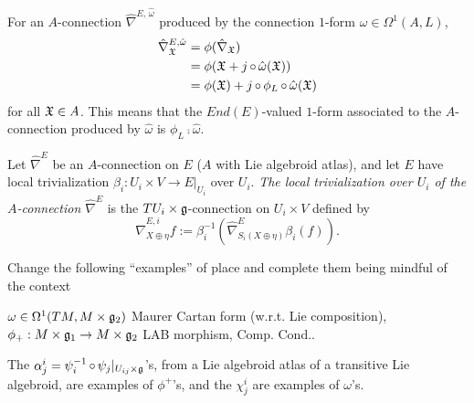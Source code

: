 For an $A$-connection $\hat \nabla^{E, \, \hat \omega}$ produced by the connection $1$-form $\hat \omega \in \Omega^1(A, L)$, 
\begin{align*}
    \hat \nabla^{E, \hat \omega}_{\oid X} &= \phi(\hat \nabla_{\oid X})\\
        &= \phi(\oid X + j \comp \hat \omega(\oid X)) \\
        &= \phi(\oid X) + j \comp \phi_L \comp \hat \omega (\oid X)
\end{align*}
for all $\mathfrak{X} \in A$. This means that the $End(E)$-valued $1$-form associated to the $A$-connection produced by $\hat \omega$ is $\phi_L \comp \hat \omega$.

\begin{definition}\label{definitionLocalTrivializationOfACOnnectionTransitiveLieAlgebroidComponents}
Let $\hat \nabla^E$ be an $A$-connection on $E$ ($A$ with Lie algebroid atlas), and let $E$ have local trivialization $\beta_i: U_i \times V\to E|_{U_i}$ over $U_i$. \emph{The local trivialization over $U_i$ of the $A$-connection $\hat \nabla^E$} is the $TU_i \times \mathfrak{g}$-connection on $U_i \times V$ defined by 
\begin{equation}
    \hat \nabla^{E, i}_{X \oplus \eta} f := \beta_i^{-1}(\hat \nabla_{S_i(X \oplus \eta)}^E \beta_i(f)).
\end{equation}
\end{definition}

\linea

{\color{gray} Change the following ``examples'' of place and complete them being mindful of the context}

\begin{example}\label{exampleLieAlgebroidMorphismsBetweenTrivialLieAlgebroids}
$\omega \in \Omega^1(TM, M \times \mathfrak{g}_2)$ Maurer Cartan form (w.r.t. Lie composition), $\phi_+: M \times \alg g_1 \to M \times \alg g_2$ LAB morphism, Comp. Cond..

The $\alpha^i_j = \psi_i^{-1} \operatorname{\circ} \psi_j |_{U_{ij}\times \mathfrak{g}}$'s, from a Lie algebroid atlas of a transitive Lie algebroid, are examples of $\phi^+$'s, and the $\chi^i_j$ are examples of $\omega$'s.
\end{example}


